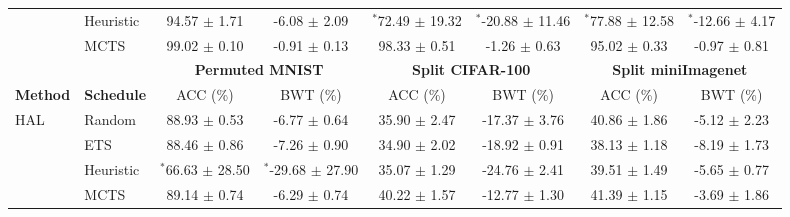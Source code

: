 \begin{tabular}{llcccccc}
	& Heuristic           & 94.57 $\pm$ 1.71     & -6.08 $\pm$ 2.09      & $^{*}$72.49 $\pm$ 19.32        & $^{*}$-20.88 $\pm$ 11.46       & $^{*}$77.88 $\pm$ 12.58      & $^{*}$-12.66 $\pm$ 4.17      \\
	& MCTS              & 99.02 $\pm$ 0.10     & -0.91 $\pm$ 0.13      & 98.33 $\pm$ 0.51         & -1.26 $\pm$ 0.63         & 95.02 $\pm$ 0.33       & -0.97 $\pm$ 0.81       \\ \midrule
	\textbf{}              & \textbf{}         & \multicolumn{2}{c}{\textbf{Permuted MNIST}}  & \multicolumn{2}{c}{\textbf{Split CIFAR-100}} & \multicolumn{2}{c}{\textbf{Split miniImagenet}} \\ \midrule
	\textbf{Method}        & \textbf{Schedule} & ACC (\%)             & BWT (\%)              & ACC (\%)             & BWT (\%)              & ACC (\%)               & BWT (\%)               \\ \midrule
	\multirow{4}{*}{HAL}   & Random            & 88.93 $\pm$ 0.53  & -6.77 $\pm$ 0.64   & 35.90 $\pm$ 2.47  & -17.37 $\pm$ 3.76  & 40.86 $\pm$ 1.86    & -5.12 $\pm$ 2.23    \\
	& ETS               & 88.46 $\pm$ 0.86  & -7.26 $\pm$ 0.90   & 34.90 $\pm$ 2.02  & -18.92 $\pm$ 0.91  & 38.13 $\pm$ 1.18    & -8.19 $\pm$ 1.73    \\
	& Heuristic           & $^{*}$66.63 $\pm$ 28.50 & $^{*}$-29.68 $\pm$ 27.90 & 35.07 $\pm$ 1.29  & -24.76 $\pm$ 2.41  & 39.51 $\pm$ 1.49    & -5.65 $\pm$ 0.77    \\
	& MCTS              & 89.14 $\pm$ 0.74  & -6.29 $\pm$ 0.74   & 40.22 $\pm$ 1.57  & -12.77 $\pm$ 1.30  & 41.39 $\pm$ 1.15    & -3.69 $\pm$ 1.86    \\ \midrule

\end{tabular}
